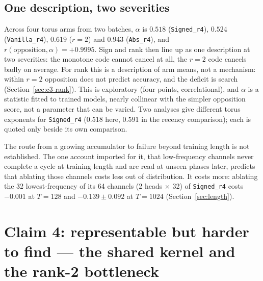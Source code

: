 \documentclass[10pt]{article}
\newcommand{\arm}[1]{\texttt{#1}}
\begin{document}
\subsection{One description, two severities}
\label{sec:c3-alpha}

Across four torus arms from two batches, $\alpha$ is $0.518$ (\arm{Signed\_r4}), $0.524$
(\arm{Vanilla\_r4}), $0.619$ ($r=2$) and $0.943$ (\arm{Abs\_r4}), and $r(\text{opposition},\alpha)=+0.9995$.
Sign and rank then line up as one description at two severities: the monotone code cannot cancel at
all, the $r=2$ code cancels badly on average. For rank this is a description of arm means, not a
mechanism: within $r=2$ opposition does not predict accuracy, and the deficit is search
(Section~\ref{sec:c3-rank}). This is exploratory (four points, correlational), and $\alpha$ is a statistic fitted
to trained models, nearly collinear with the simpler opposition score, not a parameter that can be
varied. Two analyses give different torus exponents for \arm{Signed\_r4} ($0.518$ here, $0.591$ in the
recency comparison); each is quoted only beside its own comparison. %

The route from a growing accumulator to failure beyond training length is not established. The one
account imported for it, that low-frequency channels never complete a cycle at training length and are
read at unseen phases later, predicts that ablating those channels costs less out of distribution. It
costs more: ablating the 32 lowest-frequency of its 64 channels (2 heads $\times$ 32) of \arm{Signed\_r4} costs $-0.001$ at $T=128$ and
$-0.139\pm0.092$ at $T=1024$ (Section~\ref{sec:length}). %

\section{Claim 4: representable but harder to find --- the shared kernel and the rank-2 bottleneck}
\label{sec:claim4}
\end{document}
